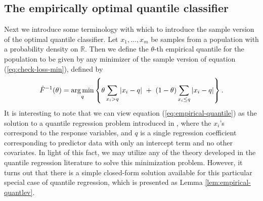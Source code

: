 

\subsection{The empirically optimal quantile classifier}
\label{sec:empirical-classifier}

Next we introduce some terminology with which to introduce the sample version of
the optimal quantile classifier.  Let $x_1, \dots, x_m$ be samples from a
population with a probability density on $\mathbb{R}$.  Then we define the
$\theta$-th empirical quantile for the population to be given by any minimizer
of the sample version of equation (\ref{eq:check-loss-min}), defined by
\begin{equation}
  \label{eq:empirical-quantile}
  \hat{F}^{-1} (\theta) = \operatorname*{arg\,min}_q \left\{
    \theta \sum_{ x_{i} > q } |x_{i} - q| ~+~
    (1 - \theta) \sum_{ x_{i} \leq q } |x_{i} - q|
  \right\}.
\end{equation}
It is interesting to note that we can view equation
(\ref{eq:empirical-quantile}) as the solution to a quantile regression problem
introduced in \cite{koenker1978}, where the $x_i$'s correspond to the response
variables, and $q$ is a single regression coefficient corresponding to predictor
data with only an intercept term and no other covariates.  In light of this
fact, we may utilize any of the theory developed in the quantile regression
literature to solve this minimization problem.  However, it turns out that there
is a simple closed-form solution available for this particular special case of
quantile regression, which is presented as Lemma \ref{lem:empirical-quantlev}.

